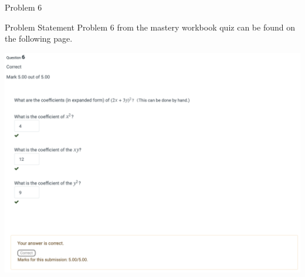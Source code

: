 \begin{problem}{Problem 6}
    \begin{statement}{Problem Statement}
        Problem 6 from the mastery workbook quiz can be found on the following page.
    \end{statement}
    \begin{Highlight}[Solution]
        \begin{center}
            \includegraphics[width = 1.0\textwidth]{Images/Problem 6.png}
        \end{center}
    \end{Highlight}
\end{problem}

